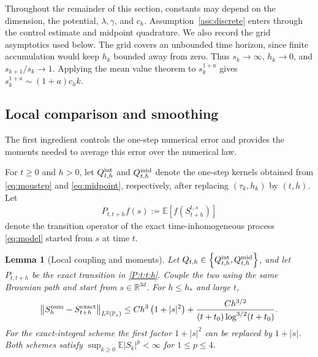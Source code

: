 \documentclass[11pt]{article}
\newtheorem{lemma}[theorem]{Lemma}
\theoremstyle{definition}
\newcommand{\R}{\mathbb R}
\newcommand{\E}{\mathbb E}
\begin{document}
Throughout the remainder of this section, constants may depend on the
dimension, the potential, $\lambda,\gamma$, and $c_h$.
Assumption~\ref{ass:discrete} enters through the control estimate and midpoint
quadrature. We also record the grid asymptotics used below. The grid covers an
unbounded time horizon, since finite accumulation would keep $h_k$ bounded away
from zero. Thus $s_k\to\infty$, $h_k\to0$, and $s_{k+1}/s_k\to1$. Applying the
mean value theorem to $s_k^{1+a}$ gives
$s_k^{1+a}\sim(1+a)c_h k$.

\subsection{Local comparison and smoothing}
The first ingredient controls the one-step numerical error and provides the
moments needed to average this error over the numerical law.

For $t\geq0$ and $h>0$, let $Q_{t,h}^{\rm int}$ and $Q_{t,h}^{\rm mid}$
denote the one-step kernels obtained from \eqref{eq:moustep} and
\eqref{eq:midpoint}, respectively, after replacing $(\tau_k,h_k)$ by $(t,h)$.
Let
\begin{align}\label{P:t:t:h}
 P_{t,t+h}f(s):=\E\left[f\left(S_{t+h}^{t,s}\right)\right]
\end{align}
denote the transition operator of the exact time-inhomogeneous process
\eqref{eq:model} started from $s$ at time $t$.

\begin{lemma}[Local coupling and moments]\label{lem:local}
Let $Q_{t,h}\in\left\{Q_{t,h}^{\rm int},Q_{t,h}^{\rm mid}\right\}$, and let
$P_{t,t+h}$ be the exact transition in \eqref{P:t:t:h}. Couple the two using the same
Brownian path and start from $s\in\R^{3d}$. For $h\leq h_*$ and large $t$,
\begin{equation}\label{eq:local}
 \left\|S_h^{\rm num}-S_{t+h}^{\rm exact}\right\|_{L^2(\mathbb P_s)}
 \leq C h^3\left(1+|s|^2\right)
       +\frac{C h^{3/2}}{(t+t_0)\log^{3/2}(t+t_0)}.
\end{equation}
For the exact-integral scheme the first factor $1+|s|^2$ can be replaced by
$1+|s|$. Both schemes satisfy $\sup_{k\geq0}\E|S_k|^p<\infty$ for
$1\leq p\leq4$.
\end{lemma}
\end{document}
